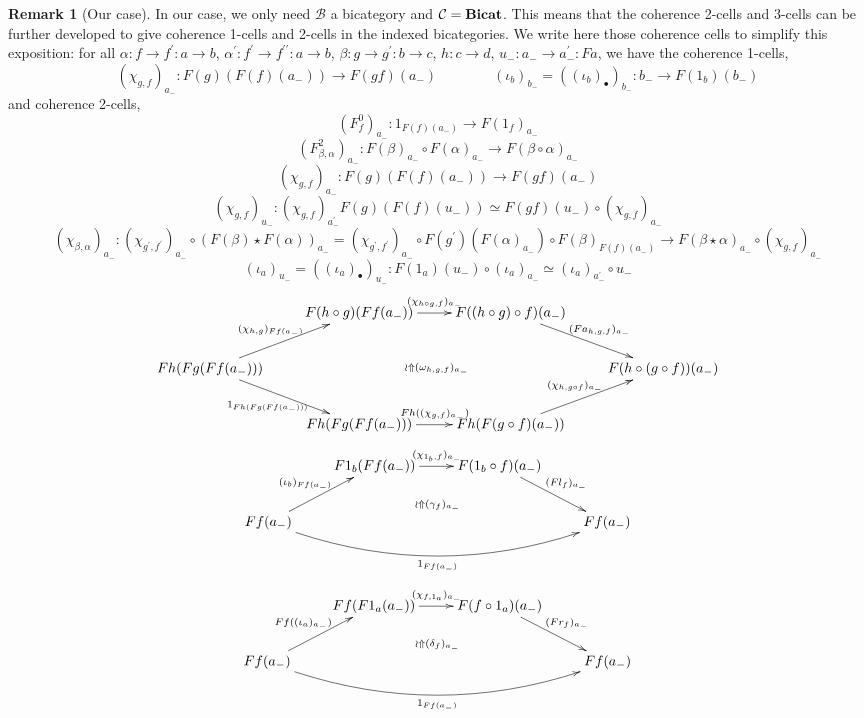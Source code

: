 \documentclass{article}
\numberwithin{equation}{section}
\theoremstyle{definition}
\newtheorem{remark}[equation]{Remark}
\theoremstyle{plain}
\newcommand{\Bicat}{\textnormal{\textbf{Bicat}}}
\begin{document}
\begin{remark}[Our case] In our case, we only need $\mathcal{B}$ a bicategory and $\mathcal{C} = \Bicat$. This means that the coherence 2-cells and 3-cells can be further developed to give coherence 1-cells and 2-cells in the indexed bicategories. We write here those coherence cells to simplify this exposition: for all $\alpha: f \to f^{\prime}:a\to b$, $\alpha^{\prime}: f^{\prime} \to f^{\prime\prime}:a\to b$, $\beta: g \to g^{\prime}:b \to c$, $h:c \to d$, $u_-: a_- \to a_-^{\prime}:Fa$, we have the coherence 1-cells,
	\[(\chi_{g,f})_{a_-}: F(g)(F(f)(a_-)) \to F(gf)(a_-) \qquad \qquad (\iota_b)_{b_-} = ((\iota_b)_{\bullet})_{b_-}: b_- \to F(1_b)(b_-)\]
	and coherence 2-cells,
	\[(F^0_f)_{a_-}: 1_{F(f)(a_-)} \to F(1_f)_{a_-}\]
	\[(F^2_{\beta, \alpha})_{a_-}: F(\beta)_{a_-} \circ F(\alpha)_{a_-} \to F(\beta \circ \alpha)_{a_-}\]
	\[(\chi_{g,f})_{a_-}: F(g)(F(f)(a_-)) \to F(gf)(a_-)\]
	\[(\chi_{g,f})_{u_-}: (\chi_{g,f})_{a_-^{\prime}} F(g)(F(f)(u_-)) \simeq F(gf)(u_-)\circ (\chi_{g,f})_{a_-}\]
	\[(\chi_{\beta,\alpha})_{a_-}: (\chi_{g^{\prime}, f^{\prime}})_{a_-} \circ (F(\beta) \star F(\alpha))_{a_-} = (\chi_{g^{\prime}, f^{\prime}})_{a_-} \circ F(g^{\prime})(F(\alpha)_{a_-}) \circ F(\beta)_{F(f)(a_-)} \to F(\beta \star \alpha)_{a_-} \circ (\chi_{g, f})_{a_-}\]
	\[(\iota_a)_{u_-} = ((\iota_a)_{\bullet})_{u_-}: F(1_a)(u_-) \circ (\iota_a)_{a_-} \simeq (\iota_a)_{a_-^{\prime}} \circ u_-\]
	\[\xymatrix{
		& F(h\circ g)(Ff(a_-)) \ar[r]^{(\chi_{h\circ g, f})_{a_-}} & F((h\circ g)\circ f)(a_-) \ar[dr]^{(Fa_{h,g,f})_{a_-}}\\
		Fh(Fg(Ff(a_-))) \ar[ur]^{(\chi_{h,g})_{Ff(a_-)}} \ar[dr]_{1_{Fh(Fg(Ff(a_-)))}} \ar@{}[rrr]|{\wr\Uparrow (\omega_{h,g,f})_{a_-}} &&& F(h \circ (g\circ f))(a_-)\\
		& Fh(Fg(Ff(a_-))) \ar[r]^{Fh((\chi_{g, f})_{a_-})} & Fh(F(g \circ f)(a_-)) \ar[ur]^{(\chi_{h,g\circ f})_{a_-}}\\
	}\]
	\[\xymatrix{
		& F1_b(Ff(a_-)) \ar[r]^{(\chi_{1_b,f})_{a_-}} & F(1_b \circ f)(a_-) \ar[dr]^{(Fl_f)_{a_-}}\\
		Ff(a_-) \ar[ur]^{(\iota_b)_{Ff(a_-)}} \ar@/_2pc/[rrr]_{1_{Ff(a_-)}} \ar@/^1pc/@{{}{ }{}}[rrr]|{\wr \Uparrow (\gamma_f)_{a_-}} &&& Ff(a_-)\\
	}\]
	\[\xymatrix{
		& Ff(F1_a(a_-)) \ar[r]^{(\chi_{f,1_a})_{a_-}} & F(f \circ 1_a)(a_-) \ar[dr]^{(Fr_f)_{a_-}}\\
		Ff(a_-) \ar[ur]^{Ff((\iota_a)_{a_-})} \ar@/_2pc/[rrr]_{1_{Ff(a_-)}} \ar@/^1pc/@{{}{ }{}}[rrr]|{\wr \Uparrow (\delta_f)_{a_-}} &&& Ff(a_-)\\
	}\]
\end{remark}
\end{document}

